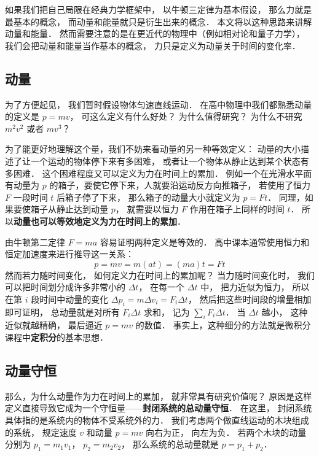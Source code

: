 
\begin{issues}
\issueTODO
\end{issues}


如果我们把自己局限在经典力学框架中， 以牛顿三定律为基本假设， 那么力就是最基本的概念， 而动量和能量就只是衍生出来的概念． 本文将以这种思路来讲解动量和能量． 然而需要注意的是在更近代的物理中（例如相对论和量子力学）， 我们会把动量和能量当作基本的概念， 力只是定义为动量关于时间的变化率．

\subsection{动量}
为了方便起见， 我们暂时假设物体匀速直线运动． 在高中物理中我们都熟悉动量的定义是 $p = mv$， 可这么定义有什么好处？ 为什么值得研究？ 为什么不研究 $m^2 v^2$ 或者 $mv^3$？



为了能更好地理解这个量，我们不妨来看动量的另一种等效定义： 动量的大小描述了让一个运动的物体停下来有多困难， 或者让一个物体从静止达到某个状态有多困难． 这个困难程度又可以定义为力在时间上的累加． 例如一个在光滑水平面有动量为 $p$ 的箱子，要使它停下来，人就要沿运动反方向推箱子， 若使用了恒力 $F$ 一段时间 $t$ 后箱子停了下来， 那么箱子的动量大小就定义为 $p = Ft$． 同理，如果要使箱子从静止达到动量 $p$， 就需要以恒力 $F$ 作用在箱子上同样的时间 $t$． 所以\textbf{动量也可以等效地定义为力在时间上的累加}．

由牛顿第二定律 $F = ma$ 容易证明两种定义是等效的． 高中课本通常使用恒力和恒定加速度来进行推导这一关系：
\begin{equation}
p = mv = m(at) = (ma)t = Ft
\end{equation}
然而若力随时间变化， 如何定义力在时间上的累加呢？ 当力随时间变化时， 我们可以把时间划分成许多非常小的 $\Delta t$， 在每一个 $\Delta t$ 中， 把力近似为恒力， 所以在第 $i$ 段时间中动量的变化 $\Delta p_i = m\Delta v_i = F_i\Delta t$， 然后把这些时间段的增量相加即可证明， 总动量就是对所有 $F_i\Delta t$ 求和， 记为 $\sum_i F_i \Delta t$． 当 $\Delta t$ 越小， 这种近似就越精确， 最后逼近 $p = mv$ 的数值． 事实上，这种细分的方法就是微积分课程中\textbf{定积分}的基本思想．

\subsection{动量守恒}
那么，为什么动量作为力在时间上的累加， 就非常具有研究价值呢？ 原因是这样定义直接导致它成为一个守恒量——\textbf{封闭系统的总动量守恒}． 在这里， 封闭系统具体指的是系统内的物体不受系统外的力． 我们考虑两个做直线运动的木块组成的系统， 规定速度 $v$ 和动量 $p = mv$ 向右为正， 向左为负． 若两个木块的动量分别为 $p_1 = m_1 v_1$， $p_2 = m_2 v_2$， 那么系统的总动量就是 $p = p_1 + p_2$．

